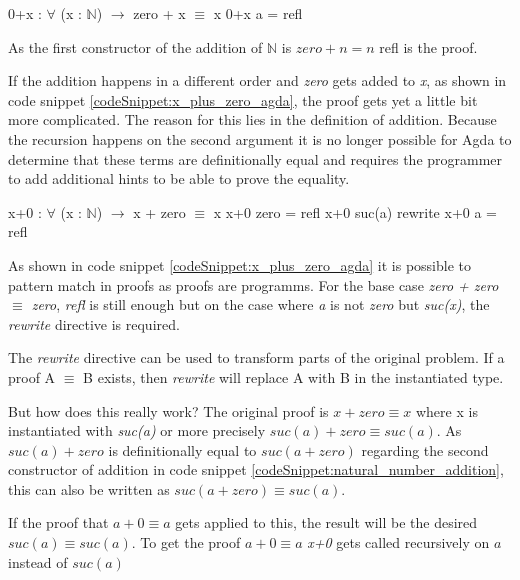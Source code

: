 \begin{codesnippet}[mathescape=true, caption={Proof of addition to zero in Agda}, label={codeSnippet:zero_plus_x_agda}]
0+x : $\forall$ (x : $\mathbb{N}$) $\rightarrow$ zero + x $\equiv$ x
0+x a = refl
\end{codesnippet}

As the first constructor of the addition of $\mathbb{N}$ is $zero + n = n$ refl is the proof.

If the addition happens in a different order and \emph{zero} gets added to \emph{x}, as shown in code snippet \ref{codeSnippet:x_plus_zero_agda}, the proof gets yet a little bit more complicated. 
The reason for this lies in the definition of addition.
Because the recursion happens on the second argument it is no longer possible for Agda to determine that these terms are definitionally equal and requires the programmer to add additional hints to be able to prove the equality.

\begin{codesnippet}[mathescape=true, caption={Proof of addition of zero in Agda}, label={codeSnippet:x_plus_zero_agda}]
x+0 : $\forall$ (x : $\mathbb{N}$) $\rightarrow$ x + zero $\equiv$ x
x+0 zero = refl
x+0 suc(a) rewrite x+0 a = refl
\end{codesnippet}

As shown in code snippet \ref{codeSnippet:x_plus_zero_agda} it is possible to pattern match in proofs as proofs are programms.
For the base case \emph{zero + zero $\equiv$ zero}, \emph{refl} is still enough but on the case where \emph{a} is not \emph{zero} but \emph{suc(x)}, the \emph{rewrite} directive is required.

The \emph{rewrite} directive can be used to transform parts of the original problem. If a proof A $\equiv$ B exists, then \emph{rewrite} will replace A with B in the instantiated type.

But how does this really work?
The original proof is $x + zero \equiv x$ where x is instantiated with \emph{suc(a)} or more precisely $suc(a) + zero \equiv suc(a)$.
As $suc(a) + zero$ is definitionally equal to $suc(a + zero)$ regarding the second constructor of addition in code snippet \ref{codeSnippet:natural_number_addition}, this can also be written as $suc(a + zero) \equiv suc(a)$.

If the proof that $a + 0 \equiv a$ gets applied to this, the result will be the desired $suc(a) \equiv suc(a)$. 
To get the proof $a + 0 \equiv a$ \emph{x+0} gets called recursively on $a$ instead of $suc(a)$


